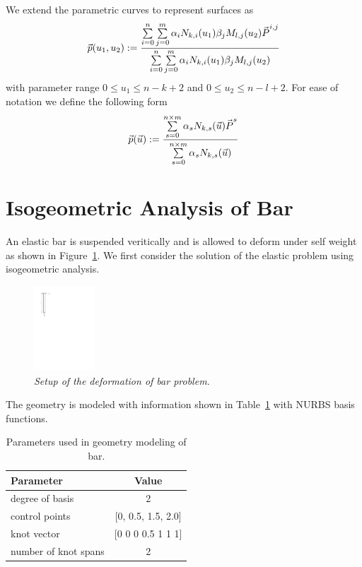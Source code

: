 \documentclass[submit,12pt]{aiaa-pretty} %
\begin{document}
We extend the parametric curves to represent surfaces as
\begin{equation}
  \vec{\mkern0mup}(u_1, u_2) := \dfrac{ {\sum\limits_{i=0}^{n} \sum\limits_{j=0}^{m} \alpha_i N_{k,i}(u_1) \beta_j M_{l,j}(u_2) \vec{\mkern0muP}^{i,j}}} {\sum\limits_{i=0}^{n} \sum\limits_{j=0}^{m} \alpha_i N_{k,i}(u_1) \beta_j M_{l,j}(u_2)}
\end{equation}
with parameter range $0 \le u_1 \le n - k + 2$ and $0 \le u_2 \le n - l + 2$. 
For ease of notation we define the following form
\begin{equation}
  \vec{\mkern0mup}(\vec{\mkern0muu}) := \dfrac{ {\sum \limits_{s=0}^{n \times m} \alpha_{s} N_{k,s}(\vec{\mkern0muu}) \vec{\mkern0muP}^{s}}} {\sum \limits_{s=0}^{n \times m} \alpha_{s} N_{k,s}(\vec{\mkern0muu})}
\end{equation}

\section{Isogeometric Analysis of Bar}
An elastic bar is suspended veritically and is allowed to deform under
self weight as shown in Figure~\ref{fig:bar-setup}. We first consider
the solution of the elastic problem using isogeometric analysis.
\begin{figure}[h] 
  \centering
  \includegraphics[width=0.2\textwidth]{bar-setup.pdf} 
  \caption{\emph{Setup of the deformation of bar problem.}}
  \label{fig:bar-setup}
\end{figure}
The geometry is modeled with information shown in
Table~\ref{tab:bar-problem-parameters} with NURBS basis functions.
\begin{table}
  \centering
  \caption{Parameters used in geometry modeling of bar.}
  \label{tab:bar-problem-parameters}
  \begin{tabular}{lc}
    \hline
    Parameter & Value \\
    \hline
    degree of basis & 2 \\
    control points  &  [0, 0.5, 1.5, 2.0] \\
    knot vector     & [0 0 0 0.5 1 1 1] \\
    number of knot spans & 2 \\
    \hline
  \end{tabular}
\end{table}
\end{document}
